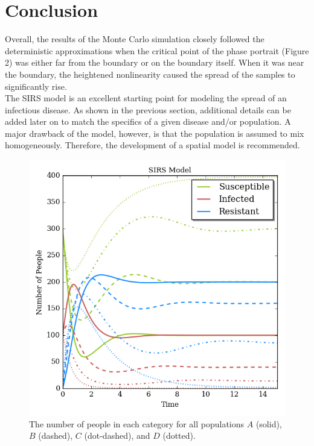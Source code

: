 \documentclass[prb,aps,twocolumn,showpacs,10pt]{revtex4-1}
\begin{document}
\section{Conclusion}

Overall, the results of the Monte Carlo simulation closely  followed the deterministic approximations when the critical point of the phase portrait (Figure 2) was either far from the boundary or on the boundary itself. When it was near the boundary, the heightened nonlinearity caused the spread of the samples to significantly rise.\\

The SIRS model is an excellent starting point for modeling the spread of an infectious disease. As shown in the previous section, additional details can be added later on to match the specifics of a given disease and/or population. A major drawback of the model, however, is that the population is assumed to mix homogeneously. Therefore, the development of a spatial model is recommended. \\



 
\begin{center}
\begin{figure}
\includegraphics[scale=0.8]{SIR_t.png}
\caption{The number of people in each category for all populations $A$ (solid), $B$ (dashed), $C$ (dot-dashed), and $D$ (dotted).}
\end{figure}
\end{center}
\end{document}
